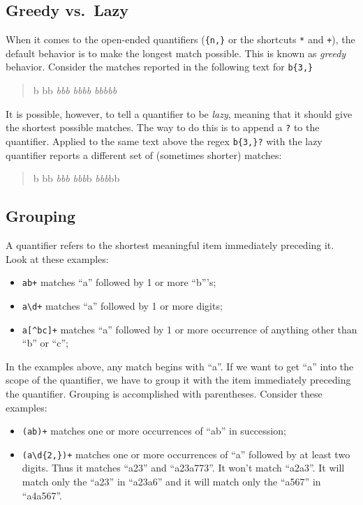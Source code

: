\documentclass[]{book}
\providecommand{\tightlist}{%
  \setlength{\itemsep}{0pt}\setlength{\parskip}{0pt}}
\theoremstyle{definition}
\theoremstyle{definition}
\theoremstyle{definition}
\theoremstyle{remark}
\begin{document}
{\subsection{Greedy vs.~Lazy}\label{greedy-vs.lazy}

When it comes to the open-ended quantifiers (\texttt{\{n,\}} or the
shortcuts \texttt{*} and \texttt{+}), the default behavior is to make
the longest match possible. This is known as \emph{greedy}
 behavior. Consider the matches reported in the following
text for \texttt{b\{3,\}}

\begin{quote}
b bb \emph{bbb} \emph{bbbb} \emph{bbbbb}
\end{quote}

It is possible, however, to tell a quantifier to be \emph{lazy},
 meaning that it should give the shortest possible matches.
The way to do this is to append a \texttt{?} to the quantifier. Applied
to the same text above the regex \texttt{b\{3,\}?} with the lazy
quantifier reports a different set of (sometimes shorter) matches:

\begin{quote}
b bb \emph{bbb} \emph{bbb}b \emph{bbb}bb
\end{quote}

\subsection{Grouping}\label{grouping}

 A quantifier refers to the shortest meaningful item
immediately preceding it. Look at these examples:

\begin{itemize}
\tightlist
\item
  \texttt{ab+} matches ``a'' followed by 1 or more ``b'''s;
\item
  \texttt{a\textbackslash{}d+} matches ``a'' followed by 1 or more
  digits;
\item
  \texttt{a{[}\^{}bc{]}+} matches ``a'' followed by 1 or more occurrence
  of anything other than ``b'' or ``c'';
\end{itemize}

In the examples above, any match begins with ``a''. If we want to get
``a'' into the scope of the quantifier, we have to group it with the
item immediately preceding the quantifier. Grouping is accomplished with
parentheses. Consider these examples:

\begin{itemize}
\tightlist
\item
  \texttt{(ab)+} matches one or more occurrences of ``ab'' in
  succession;
\item
  \texttt{(a\textbackslash{}d\{2,\})+} matches one or more occurrences
  of ``a'' followed by at least two digits. Thus it matches ``a23'' and
  ``a23a773''. It won't match ``a2a3''. It will match only the ``a23''
  in ``a23a6'' and it will match only the ``a567'' in ``a4a567''.
\end{itemize}

}
\end{document}
